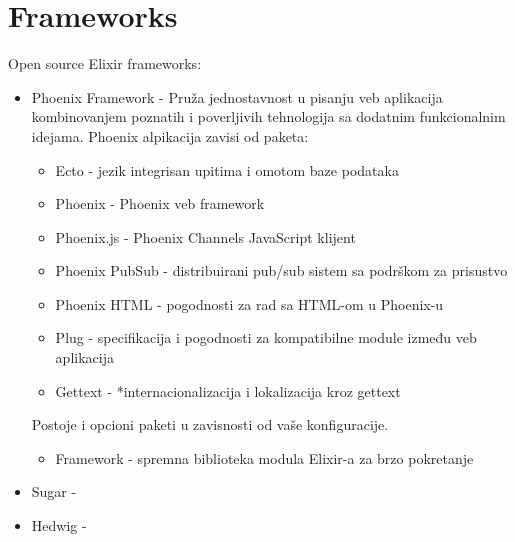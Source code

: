 \documentclass[a4paper]{article}
\begin{document}
\section{Frameworks}
Open source Elixir frameworks:
\begin{itemize}
    \item Phoenix Framework - Pruža jednostavnost u pisanju veb aplikacija kombinovanjem poznatih i poverljivih tehnologija sa dodatnim funkcionalnim idejama. Phoenix alpikacija zavisi od paketa:
    \begin{itemize}
        \item Ecto - jezik integrisan upitima i omotom baze podataka
        \item Phoenix - Phoenix veb framework
        \item Phoenix.js - Phoenix Channels JavaScript klijent
        \item Phoenix PubSub - distribuirani pub/sub sistem sa podrškom za prisustvo
        \item Phoenix HTML - pogodnosti za rad sa HTML-om u Phoenix-u
        \item Plug - specifikacija i pogodnosti za kompatibilne module između veb aplikacija
        \item Gettext - *internacionalizacija i lokalizacija kroz gettext
    \end{itemize}
    Postoje i opcioni paketi u zavisnosti od vaše konfiguracije.
    \begin{itemize}
        \item Framework - spremna biblioteka modula Elixir-a za brzo pokretanje
    \end{itemize}
    \item Sugar - 
    \item Hedwig -
\end{itemize}
\end{document}
